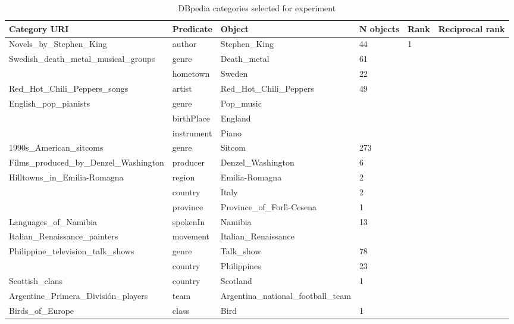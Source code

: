 \begin{table}[]
\caption{DBpedia categories selected for experiment}
\label{tab:dbpedia_categories}
\begin{tabular}{|l|l|l|l|l|l|}
\hline
Category URI & Predicate & Object & N objects & Rank & Reciprocal rank \\ \hline
Novels\_by\_Stephen\_King & author & Stephen\_King & 44 & 1 &  \\ \hline
\multirow{2}{*}{Swedish\_death\_metal\_musical\_groups} & genre & Death\_metal & 61 &  &  \\ \cline{2-6} 
 & hometown & Sweden & 22 &  &  \\ \hline
Red\_Hot\_Chili\_Peppers\_songs & artist & Red\_Hot\_Chili\_Peppers & 49 &  &  \\ \hline
\multirow{3}{*}{English\_pop\_pianists} & genre & Pop\_music &  &  &  \\ \cline{2-6} 
 & birthPlace & England &  &  &  \\ \cline{2-6} 
 & instrument & Piano &  &  &  \\ \hline
1990s\_American\_sitcoms & genre & Sitcom & 273 &  &  \\ \hline
Films\_produced\_by\_Denzel\_Washington & producer & Denzel\_Washington & 6 &  &  \\ \hline
\multirow{3}{*}{Hilltowns\_in\_Emilia-Romagna} & region & Emilia-Romagna & 2 &  &  \\ \cline{2-6} 
 & country & Italy & 2 &  &  \\ \cline{2-6} 
 & province & Province\_of\_Forlì-Cesena & 1 &  &  \\ \hline
Languages\_of\_Namibia & spokenIn & Namibia & 13 &  &  \\ \hline
Italian\_Renaissance\_painters & movement & Italian\_Renaissance &  &  &  \\ \hline
\multirow{2}{*}{Philippine\_television\_talk\_shows} & genre & Talk\_show & 78 &  &  \\ \cline{2-6} 
 & country & Philippines & 23 &  &  \\ \hline
Scottish\_clans & country & Scotland & 1 &  &  \\ \hline
Argentine\_Primera\_División\_players & team & Argentina\_national\_football\_team &  &  &  \\ \hline
Birds\_of\_Europe & class & Bird & 1 &  &  \\ \hline
\end{tabular}
\end{table}